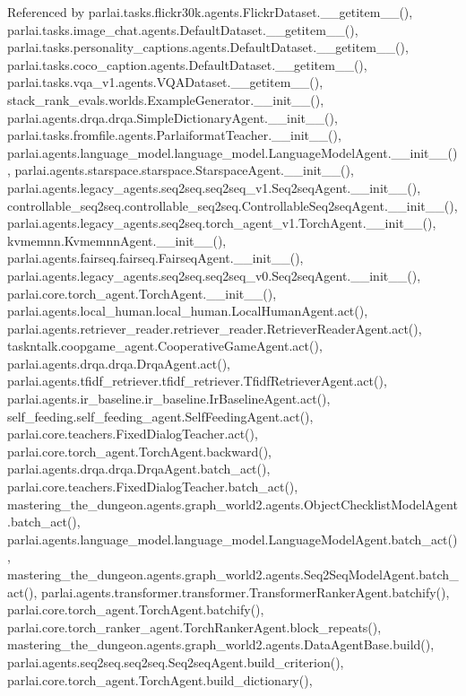 Referenced by parlai.\+tasks.\+flickr30k.\+agents.\+Flickr\+Dataset.\+\_\+\+\_\+getitem\+\_\+\+\_\+(), parlai.\+tasks.\+image\+\_\+chat.\+agents.\+Default\+Dataset.\+\_\+\+\_\+getitem\+\_\+\+\_\+(), parlai.\+tasks.\+personality\+\_\+captions.\+agents.\+Default\+Dataset.\+\_\+\+\_\+getitem\+\_\+\+\_\+(), parlai.\+tasks.\+coco\+\_\+caption.\+agents.\+Default\+Dataset.\+\_\+\+\_\+getitem\+\_\+\+\_\+(), parlai.\+tasks.\+vqa\+\_\+v1.\+agents.\+V\+Q\+A\+Dataset.\+\_\+\+\_\+getitem\+\_\+\+\_\+(), stack\+\_\+rank\+\_\+evals.\+worlds.\+Example\+Generator.\+\_\+\+\_\+init\+\_\+\+\_\+(), parlai.\+agents.\+drqa.\+drqa.\+Simple\+Dictionary\+Agent.\+\_\+\+\_\+init\+\_\+\+\_\+(), parlai.\+tasks.\+fromfile.\+agents.\+Parlaiformat\+Teacher.\+\_\+\+\_\+init\+\_\+\+\_\+(), parlai.\+agents.\+language\+\_\+model.\+language\+\_\+model.\+Language\+Model\+Agent.\+\_\+\+\_\+init\+\_\+\+\_\+(), parlai.\+agents.\+starspace.\+starspace.\+Starspace\+Agent.\+\_\+\+\_\+init\+\_\+\+\_\+(), parlai.\+agents.\+legacy\+\_\+agents.\+seq2seq.\+seq2seq\+\_\+v1.\+Seq2seq\+Agent.\+\_\+\+\_\+init\+\_\+\+\_\+(), controllable\+\_\+seq2seq.\+controllable\+\_\+seq2seq.\+Controllable\+Seq2seq\+Agent.\+\_\+\+\_\+init\+\_\+\+\_\+(), parlai.\+agents.\+legacy\+\_\+agents.\+seq2seq.\+torch\+\_\+agent\+\_\+v1.\+Torch\+Agent.\+\_\+\+\_\+init\+\_\+\+\_\+(), kvmemnn.\+Kvmemnn\+Agent.\+\_\+\+\_\+init\+\_\+\+\_\+(), parlai.\+agents.\+fairseq.\+fairseq.\+Fairseq\+Agent.\+\_\+\+\_\+init\+\_\+\+\_\+(), parlai.\+agents.\+legacy\+\_\+agents.\+seq2seq.\+seq2seq\+\_\+v0.\+Seq2seq\+Agent.\+\_\+\+\_\+init\+\_\+\+\_\+(), parlai.\+core.\+torch\+\_\+agent.\+Torch\+Agent.\+\_\+\+\_\+init\+\_\+\+\_\+(), parlai.\+agents.\+local\+\_\+human.\+local\+\_\+human.\+Local\+Human\+Agent.\+act(), parlai.\+agents.\+retriever\+\_\+reader.\+retriever\+\_\+reader.\+Retriever\+Reader\+Agent.\+act(), taskntalk.\+coopgame\+\_\+agent.\+Cooperative\+Game\+Agent.\+act(), parlai.\+agents.\+drqa.\+drqa.\+Drqa\+Agent.\+act(), parlai.\+agents.\+tfidf\+\_\+retriever.\+tfidf\+\_\+retriever.\+Tfidf\+Retriever\+Agent.\+act(), parlai.\+agents.\+ir\+\_\+baseline.\+ir\+\_\+baseline.\+Ir\+Baseline\+Agent.\+act(), self\+\_\+feeding.\+self\+\_\+feeding\+\_\+agent.\+Self\+Feeding\+Agent.\+act(), parlai.\+core.\+teachers.\+Fixed\+Dialog\+Teacher.\+act(), parlai.\+core.\+torch\+\_\+agent.\+Torch\+Agent.\+backward(), parlai.\+agents.\+drqa.\+drqa.\+Drqa\+Agent.\+batch\+\_\+act(), parlai.\+core.\+teachers.\+Fixed\+Dialog\+Teacher.\+batch\+\_\+act(), mastering\+\_\+the\+\_\+dungeon.\+agents.\+graph\+\_\+world2.\+agents.\+Object\+Checklist\+Model\+Agent.\+batch\+\_\+act(), parlai.\+agents.\+language\+\_\+model.\+language\+\_\+model.\+Language\+Model\+Agent.\+batch\+\_\+act(), mastering\+\_\+the\+\_\+dungeon.\+agents.\+graph\+\_\+world2.\+agents.\+Seq2\+Seq\+Model\+Agent.\+batch\+\_\+act(), parlai.\+agents.\+transformer.\+transformer.\+Transformer\+Ranker\+Agent.\+batchify(), parlai.\+core.\+torch\+\_\+agent.\+Torch\+Agent.\+batchify(), parlai.\+core.\+torch\+\_\+ranker\+\_\+agent.\+Torch\+Ranker\+Agent.\+block\+\_\+repeats(), mastering\+\_\+the\+\_\+dungeon.\+agents.\+graph\+\_\+world2.\+agents.\+Data\+Agent\+Base.\+build(), parlai.\+agents.\+seq2seq.\+seq2seq.\+Seq2seq\+Agent.\+build\+\_\+criterion(), parlai.\+core.\+torch\+\_\+agent.\+Torch\+Agent.\+build\+\_\+dictionary(), 